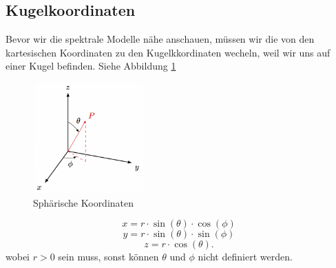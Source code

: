 \subsection{Kugelkoordinaten
\label{spektral:subsection:kugelkoordinaten}}

Bevor wir die spektrale Modelle nähe anschauen, müssen wir die von den kartesischen Koordinaten zu den Kugelkkordinaten wecheln, weil wir uns auf einer Kugel befinden. Siehe Abbildung \ref{spektral:fig:sphericalcoords}

\begin{figure}[h]
	\centering
	\includegraphics[height=120pt,width=120pt]{papers/spektral/images/spherical_coordinates.png}
	\caption{Sphärische Koordinaten}
    \label{spektral:fig:sphericalcoords}
\end{figure}
\pagebreak

\begin{equation}
x = r\cdot\sin(\theta)\cdot\cos(\phi)
\label{spektral:equation4}
\end{equation}
\begin{equation}
 y = r\cdot\sin(\theta)\cdot\sin(\phi)
\label{spektral:equation5}
\end{equation}
\begin{equation}
 z = r\cdot\cos(\theta).
\label{spektral:equation6}
\end{equation}
wobei $r > 0$ sein muss, sonst können $\theta$ und $\phi$ nicht definiert werden.



